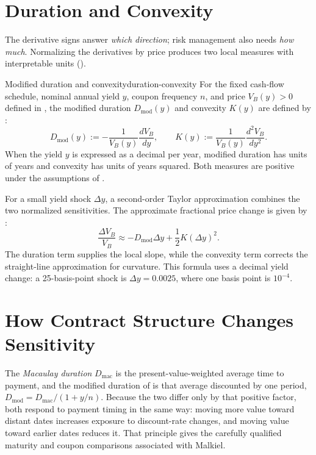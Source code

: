 \documentclass[11pt]{article}
\newcommand{\B}{V_{B}}
\begin{document}
\section{Duration and Convexity}

The derivative signs answer \emph{which direction}; risk management also needs \emph{how much}. Normalizing the derivatives by price produces two local measures with interpretable units ().

\begin{definition}{Modified duration and convexity}{duration-convexity}
For the fixed cash-flow schedule, nominal annual yield $y$, coupon frequency $n$, and price $\B(y)>0$ defined in , the modified duration $D_{\mathrm{mod}}(y)$ and convexity $K(y)$ are defined by :
\begin{equation}
  \label{eq:risk-measures}
  D_{\mathrm{mod}}(y):=-\frac{1}{\B(y)}\frac{d\B}{dy},
  \qquad
  K(y):=\frac{1}{\B(y)}\frac{d^2\B}{dy^2}.
\end{equation}
When the yield $y$ is expressed as a decimal per year, modified duration has units of years and convexity has units of years squared. Both measures are positive under the assumptions of .
\end{definition}

For a small yield shock $\Delta y$, a second-order Taylor approximation combines the two normalized sensitivities. The approximate fractional price change is given by :
\begin{equation}
  \label{eq:duration-convexity-approximation}
  \frac{\Delta\B}{\B}
  \approx-D_{\mathrm{mod}}\Delta y+\frac{1}{2}K(\Delta y)^2.
\end{equation}
The duration term supplies the local slope, while the convexity term corrects the straight-line approximation for curvature. This formula uses a decimal yield change: a 25-basis-point shock is $\Delta y=0.0025$, where one basis point is $10^{-4}$.

\section{How Contract Structure Changes Sensitivity}

The \emph{Macaulay duration} $D_{\mathrm{mac}}$ is the present-value-weighted average time to payment, and the modified duration of  is that average discounted by one period, $D_{\mathrm{mod}}=D_{\mathrm{mac}}/(1+y/n)$. Because the two differ only by that positive factor, both respond to payment timing in the same way: moving more value toward distant dates increases exposure to discount-rate changes, and moving value toward earlier dates reduces it. That principle gives the carefully qualified maturity and coupon comparisons associated with Malkiel.
\end{document}
